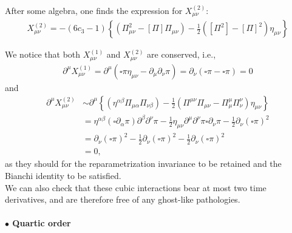 \documentclass{book}
\theoremstyle{definition}
\newcommand{\p}{\partial}
\newcommand{\nn}{\nonumber}
\newcommand{\al}{\alpha}
\newcommand{\be}{\beta}
\newcommand{\f}[2]{\frac{#1}{#2}}
\newcommand{\lp}{\left(}
\newcommand{\rp}{\right)}
\newcommand{\lc}{\left\{}
\newcommand{\rc}{\right\}}
\begin{document}
After some algebra, one finds the expression for $X^{(2)}_{\mu\nu}$:
\begin{align}
X_{\mu\nu}^{(2)} = -(6c_3 - 1)\lc (\Pi^2_{\mu\nu} - [\Pi]\Pi_{\mu\nu}) - \f{1}{2}([\Pi^2] - [\Pi]^2)\eta_{\mu\nu} \rc
\end{align}



We notice that both $X_{\mu\nu}^{(1)}$ and $X_{\mu\nu}^{(2)}$ are conserved, i.e.,
\begin{align}
\p^\mu X^{(1)}_{\mu\nu} = \p^\mu \lp \square \pi \eta_{\mu\nu} - \p_\mu \p_\nu \pi \rp = \p_\nu \lp \square \pi - \square \pi \rp = 0
\end{align}
and 
\begin{align}
\p^\mu X^{(2)}_{\mu\nu} &\sim \p^\mu \lc (\eta^{\al\be}\Pi_{\mu\al}\Pi_{\nu\be}) - \f{1}{2}(\Pi^{\mu\nu}\Pi_{\mu\nu} - \Pi^\mu_\mu \Pi^\nu_\nu)\eta_{\mu\nu} \rc\nn\\
&= \eta^{\al\be} (\square \p_\al \pi)\p^\be \p^\nu \pi - \f{1}{2}\eta_{\mu\nu}\p^\mu \p^\nu \pi \square \p_\nu \pi - \f{1}{2}\p_\nu (\square \pi)^2\nn\\
&= \p_\nu (\square \pi)^2 - \f{1}{2}\p_\nu (\square \pi)^2 - \f{1}{2}\p_\nu (\square \pi)^2\\
&= 0 ,
\end{align}
as they should for the
reparametrization invariance to be retained and the Bianchi identity to be satisfied.\\

We can also check that these cubic interactions bear at most two time derivatives, and are therefore free of any ghost-like pathologies. 

 













\paragraph{$\bullet$ Quartic order}
\end{document}
